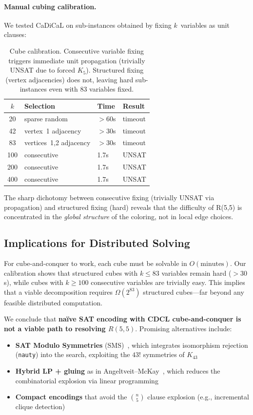 \documentclass[11pt,a4paper]{article}
\theoremstyle{definition}
\theoremstyle{remark}
\newcommand{\Kn}[1]{K_{#1}}
\begin{document}
\paragraph{Manual cubing calibration.}
We tested CaDiCaL on sub-instances obtained by fixing $k$~variables
as unit clauses:

\begin{table}[h]
\centering
\begin{tabular}{clll}
\toprule
$k$ & \textbf{Selection} & \textbf{Time} & \textbf{Result} \\
\midrule
20  & sparse random & $>60$s & timeout \\
42  & vertex~1 adjacency & $>30$s & timeout \\
83  & vertices~1,2 adjacency & $>30$s & timeout \\
100 & consecutive & 1.7s & UNSAT \\
200 & consecutive & 1.7s & UNSAT \\
400 & consecutive & 1.7s & UNSAT \\
\bottomrule
\end{tabular}
\caption{Cube calibration.  Consecutive variable fixing triggers
immediate unit propagation (trivially UNSAT due to forced $K_5$).
Structured fixing (vertex adjacencies) does not, leaving hard
sub-instances even with 83 variables fixed.}
\label{tab:cubes}
\end{table}

The sharp dichotomy between consecutive fixing (trivially UNSAT
via propagation) and structured fixing (hard) reveals that
the difficulty of R(5,5) is concentrated in the \emph{global
structure} of the coloring, not in local edge choices.

\subsection{Implications for Distributed Solving}

For cube-and-conquer to work, each cube must be solvable in
$O(\text{minutes})$.  Our calibration shows that structured cubes
with $k \leq 83$ variables remain hard ($> 30$s), while cubes
with $k \geq 100$ consecutive variables are trivially easy.
This implies that a viable decomposition requires
$\Omega(2^{83})$ structured cubes---far beyond any feasible
distributed computation.

We conclude that \textbf{na\"ive SAT encoding with CDCL
cube-and-conquer is not a viable path to resolving $R(5,5)$}.
Promising alternatives include:
\begin{itemize}
  \item \textbf{SAT Modulo Symmetries} (SMS)~\cite{KirchwegerSzeider2023},
    which integrates isomorphism rejection (\texttt{nauty}) into
    the search, exploiting the $43!$ symmetries of $\Kn{43}$
  \item \textbf{Hybrid LP + gluing} as in Angeltveit--McKay~\cite{AngeltveitMcKay2024},
    which reduces the combinatorial explosion via linear programming
  \item \textbf{Compact encodings} that avoid the $\binom{n}{5}$
    clause explosion (e.g., incremental clique detection)
\end{itemize}
\end{document}
